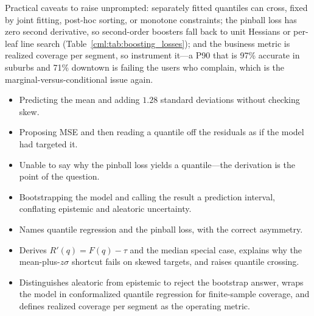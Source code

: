\begin{interviewq}
Practical caveats to raise unprompted: separately fitted quantiles can cross, fixed by joint fitting, post-hoc sorting, or monotone constraints; the pinball loss has zero second derivative, so second-order boosters fall back to unit Hessians or per-leaf line search (Table~\ref{cml:tab:boosting_losses}); and the business metric is realized coverage per segment, so instrument it---a P90 that is 97\% accurate in suburbs and 71\% downtown is failing the users who complain, which is the marginal-versus-conditional issue again.

\redflags
\begin{itemize}
    \item Predicting the mean and adding $1.28$ standard deviations without checking skew.
    \item Proposing MSE and then reading a quantile off the residuals as if the model had targeted it.
    \item Unable to say why the pinball loss yields a quantile---the derivation is the point of the question.
    \item Bootstrapping the model and calling the result a prediction interval, conflating epistemic and aleatoric uncertainty.
\end{itemize}


\goodgreat
\begin{itemize}
    \item {} Names quantile regression and the pinball loss, with the correct asymmetry.
    \item {} Derives $R'(q) = F(q)-\tau$ and the median special case, explains why the mean-plus-$z\sigma$ shortcut fails on skewed targets, and raises quantile crossing.
    \item {} Distinguishes aleatoric from epistemic to reject the bootstrap answer, wraps the model in conformalized quantile regression for finite-sample coverage, and defines realized coverage per segment as the operating metric.
\end{itemize}

\end{interviewq}

